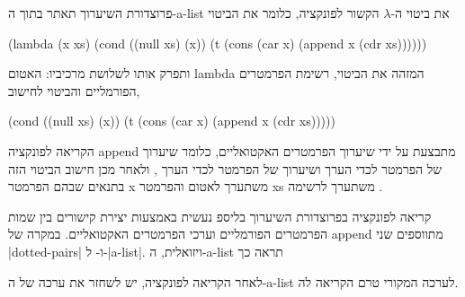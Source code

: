 פרוצדורת השיערוך תאתר בתוך ה-a-list את ביטוי ה-$λ$ הקשור לפונקציה, כלומר
את הביטוי
\begin{LISP}
(lambda
  (x xs)
  (cond ((null xs) (x))
        (t (cons
              (car x)
              (append x (cdr xs))))))
\end{LISP}
ותפרק אותו לשלושת
מרכיביו: האטום lambda המזהה את הביטוי, רשימת הפרמטרים הפורמליים 
והביטוי לחישוב,
\begin{LISP}
(cond ((null xs) (x))
      (t (cons
            (car x)
            (append x (cdr xs)))))
\end{LISP}
הקריאה לפונקציה append מתבצעת על ידי שיערוך הפרמטרים האקטואליים, כלומר שיערוך
של הפרמטר  לכדי הערך  ושיערוך של הפרמטר 
לכדי הערך , ולאחר מכן חישוב
הביטוי הזה בתנאים שבהם הפרמטר x משתערך לאטום
 והפרמטר xs משתערך לרשימה .

קריאה לפונקציה בפרוצדורת השיערוך בליספ נעשית באמצעות יצירת קישורים בין שמות הפרמטרים הפורמליים
וערכי הפרמטרים האקטואליים. במקרה של append מתווספים שני \E|dotted-pairs|
 ו- ל-\E|a-list|.
ויזואלית, ה-a-list תראה כך
\begin{LTR}
\end{LTR}
לאחר הקריאה לפונקציה, יש לשחזר את ערכה של ה-a-list לערכה המקורי טרם הקריאה לה.

